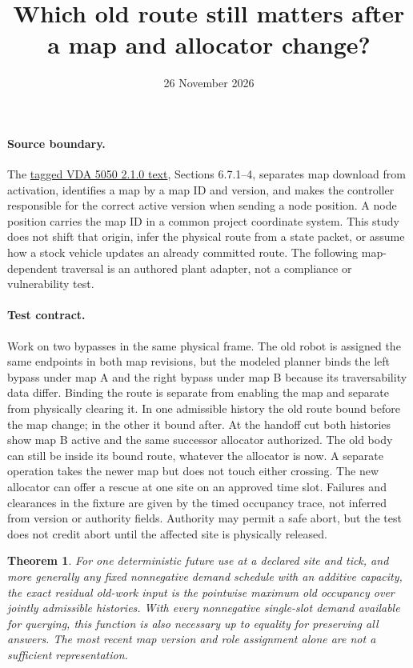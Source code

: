 \documentclass[11pt]{article}
\title{Which old route still matters after a map and allocator change?}
\author{}
\date{26 November 2026}
\newtheorem{theorem}{Theorem}
\begin{document}
\maketitle

\paragraph{Source boundary.}
The \href{https://github.com/VDA5050/VDA5050/blob/511d01d71587e8a3dc5e71d4f41dc52466f4284c/VDA5050_EN.md\#67-maps}{tagged VDA 5050 2.1.0 text}, Sections 6.7.1--4, separates map download from activation, identifies a map by a map ID and version, and makes the controller responsible for the correct active version when sending a node position. A node position carries the map ID in a common project coordinate system. This study does not shift that origin, infer the physical route from a state packet, or assume how a stock vehicle updates an already committed route. The following map-dependent traversal is an authored plant adapter, not a compliance or vulnerability test.

\paragraph{Test contract.}
Work on two bypasses in the same physical frame. The old robot is assigned the same endpoints in both map revisions, but the modeled planner binds the left bypass under map A and the right bypass under map B because its traversability data differ. Binding the route is separate from enabling the map and separate from physically clearing it. In one admissible history the old route bound before the map change; in the other it bound after. At the handoff cut both histories show map B active and the same successor allocator authorized. The old body can still be inside its bound route, whatever the allocator is now. A separate operation takes the newer map but does not touch either crossing. The new allocator can offer a rescue at one site on an approved time slot. Failures and clearances in the fixture are given by the timed occupancy trace, not inferred from version or authority fields. Authority may permit a safe abort, but the test does not credit abort until the affected site is physically released.

\begin{theorem}
For one deterministic future use at a declared site and tick, and more generally any fixed nonnegative demand schedule with an additive capacity, the exact residual old-work input is the pointwise maximum old occupancy over jointly admissible histories. With every nonnegative single-slot demand available for querying, this function is also necessary up to equality for preserving all answers. The most recent map version and role assignment alone are not a sufficient representation.
\end{theorem}
\end{document}

